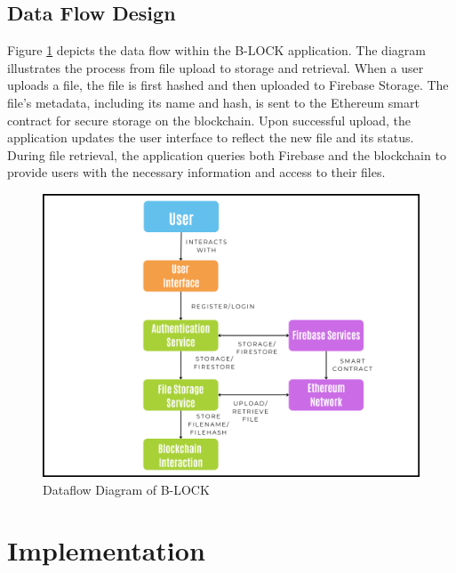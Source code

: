 \documentclass[12pt,a4paper]{report}
\begin{document}
\section{Data Flow Design}
Figure \ref{fig:dataflow} depicts the data flow within the B-LOCK application. The diagram illustrates the process from file upload to storage and retrieval. When a user uploads a file, the file is first hashed and then uploaded to Firebase Storage. The file's metadata, including its name and hash, is sent to the Ethereum smart contract for secure storage on the blockchain. Upon successful upload, the application updates the user interface to reflect the new file and its status. During file retrieval, the application queries both Firebase and the blockchain to provide users with the necessary information and access to their files.

\begin{figure}[hbtp]
\centering
\includegraphics[scale=0.5]{./pic/dataflow.png}
\caption{Dataflow Diagram of B-LOCK}
\label{fig:dataflow}
\end{figure} 



\chapter{Implementation}
\end{document}
